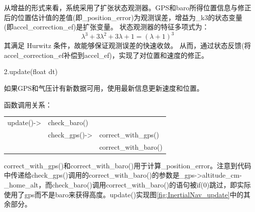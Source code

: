 \documentclass[a4paper,10pt]{ctexart} %
\begin{document}
从增益的形式来看，系统采用了扩张状态观测器。GPS和baro所得位置信息与修正后的位置估计值的差值(即\_position\_error)为观测误差，增益为\_k3的状态变量(即accel\_correction\_ef)是扩张变量。
状态观测器的特征多项式为：
\begin{equation}
\lambda^3+3\lambda^2+3\lambda+1=(\lambda+1)^3
\end{equation}
其满足 Hurwitz 条件，故能够保证观测误差的快速收敛。
从而，通过状态反馈(将accel\_correction\_ef补偿到accel\_ef)，实现了对位置和速度的修正。

\vspace{10pt}
\noindent 2.update(float dt)

如果GPS和气压计有新数据可用，使用最新信息更新速度和位置。

\noindent 函数调用关系：\\
\vspace{-20pt}
\begin{tabular}{lll}
update()->  & check\_baro()		&	\\
			& check\_gps()->	& correct\_with\_gps()	\\
			&					& correct\_with\_baro()
\end{tabular}

\vspace{20pt}
\noindent correct\_with\_gps()和correct\_with\_baro()用于计算\_position\_error。注意到代码中传递给check\_gps()调用的correct\_with\_baro()的参数是\_gps->altitude\_cm-\_home\_alt，而check\_baro()调用correct\_with\_baro()的语句被if(0)跳过，即实际使用了gps而不是baro来获得高度。update()实现图\ref{fig:InertialNav_update}中的其余部分。
\end{document}

